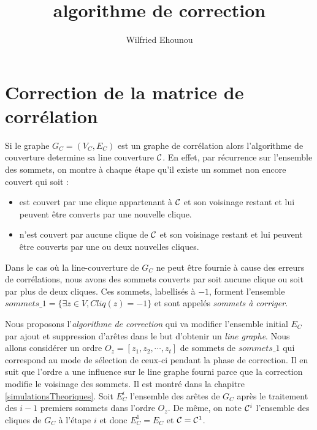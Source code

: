 \documentclass[onecolumn, 12pt]{book}
\title{algorithme de correction}
\author{Wilfried Ehounou}
\date{\oldstylenums{\today}}
\begin{document}
\maketitle
\tableofcontents

\section{Correction de la matrice de corr\'elation}
Si le graphe $G_C=(V_C, E_C)$ est un graphe de corr\'elation alors l'algorithme de couverture determine sa line couverture $\cal C$.
En effet, par r\'ecurrence sur l'ensemble des sommets, on montre \`a chaque \'etape qu'il existe un sommet non encore couvert qui soit :
\begin{itemize}
\item  est couvert par une clique appartenant \`a $\cal C$ et son voisinage restant et lui peuvent \^etre converts par une nouvelle clique.
\item n'est couvert par aucune clique de  $\cal C$ et son voisinage restant et lui peuvent \^etre couverts par une ou deux nouvelles cliques.
\end{itemize}
Dans le cas o\`u la line-couverture de $G_C$ ne peut \^etre fournie \`a cause des erreurs de corr\'elations, nous avons des sommets couverts par soit aucune clique ou soit par plus de deux cliques. Ces sommets, labellis\'es \`a $-1$, forment l'ensemble 
$sommets\_1 = \{\exists z \in V, Cliq(z) = -1 \}$ 
et sont appel\'es {\em sommets \`a corriger}.
\newline

Nous proposons l'{\em algorithme de correction} qui va modifier l'ensemble initial $E_C$ par ajout et suppression d'ar\^etes dans le but d'obtenir un {\em line graphe}.
Nous allons consid\'erer un ordre $O_z = [z_1, z_2, \cdots, z_t]$ de sommets de $sommets\_1$ qui correspond au mode de s\'election de ceux-ci pendant la phase de correction.
Il en suit que l'ordre a une influence sur le line graphe fourni parce que la correction modifie le voisinage des sommets. Il est montr\'e dans la chapitre \ref{simulationsTheoriques}.
\newline
Soit $E_C^i$ l'ensemble des ar\^etes de $G_C$ apr\`es le traitement des $i-1$ premiers sommets dans l'ordre $O_z$. De m\^eme, on note ${\cal C}^i$ l'ensemble des cliques de $G_C$ \`a l'\'etape $i$ et donc $E_C^1 = E_C$ et ${\cal C} = {\cal C}^1$.
\newline
\end{document}
